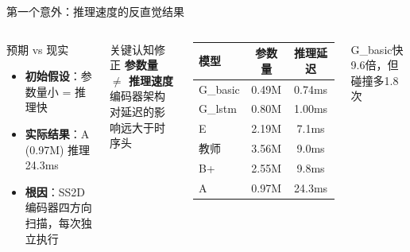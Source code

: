 \documentclass[aspectratio=169,10pt]{beamer}
\newcommand{\con}[1]{\textcolor{negative}{#1}}
\newcommand{\HL}[1]{\textcolor{emphasis}{#1}}
\begin{document}
\begin{frame}{第一个意外：推理速度的反直觉结果}
\begin{columns}[T]
\begin{block}{预期 vs 现实}
\begin{itemize}
\item \textbf{初始假设}：参数量小 = 推理快
\item \textbf{实际结果}：\HL{A (0.97M)} 推理 \con{24.3ms}
\item \textbf{根因}：SS2D编码器四方向扫描，每次独立执行
\end{itemize}
\end{block}

\begin{block}{关键认知修正}
\footnotesize
\textbf{参数量 $\neq$ 推理速度}\\
编码器架构对延迟的影响远大于时序头
\end{block}

\begin{table}
\centering\footnotesize
\begin{tabular}{lcc}
\toprule
模型 & 参数量 & 推理延迟 \\
\midrule
\HL{G\_basic} & 0.49M & \HL{0.74ms} \\
G\_lstm & 0.80M & 1.00ms \\
\HL{E} & 2.19M & 7.1ms \\
教师 & 3.56M & 9.0ms \\
B+ & 2.55M & 9.8ms \\
\con{A} & \con{0.97M} & \con{24.3ms} \\
\bottomrule
\end{tabular}
\end{table}
\footnotesize\centering G\_basic快9.6倍，但碰撞多1.8次
\end{columns}
\end{frame}
\end{document}

